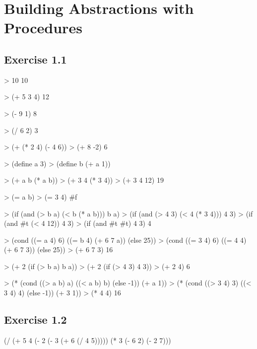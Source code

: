 \chapter{\Large{Building Abstractions with Procedures}}
\section{Exercise 1.1}
\begin{lisp}
> 10
10
\end{lisp}
\begin{lisp}
> (+ 5 3 4)
12
\end{lisp}
\begin{lisp}
> (- 9 1)
8
\end{lisp}
\begin{lisp}
> (/ 6 2)
3
\end{lisp}
\begin{lisp}
> (+ (* 2 4) (- 4 6))
> (+ 8 -2)
6
\end{lisp}
\begin{lisp}
> (define a 3)
> (define b (+ a 1))
\end{lisp}
\begin{lisp}
> (+ a b (* a b))
> (+ 3 4 (* 3 4))
> (+ 3 4 12)
19
\end{lisp}
\begin{lisp}
> (= a b)
> (= 3 4)
#f
\end{lisp}
\begin{lisp}
> (if (and (> b a) (< b (* a b))) b a)
> (if (and (> 4 3) (< 4 (* 3 4))) 4 3)
> (if (and #t (< 4 12)) 4 3)
> (if (and #t #t) 4 3)
4
\end{lisp}
\begin{lisp}
> (cond ((= a 4) 6)
        ((= b 4) (+ 6 7 a))
        (else 25))
> (cond ((= 3 4) 6)
        ((= 4 4) (+ 6 7 3))
        (else 25))
> (+ 6 7 3)
16
\end{lisp}
\begin{lisp}
> (+ 2 (if (> b a) b a))
> (+ 2 (if (> 4 3) 4 3))
> (+ 2 4)
6
\end{lisp}
\begin{lisp}
> (* (cond ((> a b) a)
           ((< a b) b)
           (else -1))
     (+ a 1))
> (* (cond ((> 3 4) 3)
           ((< 3 4) 4)
           (else -1))
     (+ 3 1))
> (* 4 4)
16
\end{lisp}

\section{Exercise 1.2}
\begin{lisp}
(/ (+ 5 4
      (- 2
         (- 3
            (+ 6 (/ 4 5)))))
   (* 3
      (- 6 2)
      (- 2 7)))
\end{lisp}


